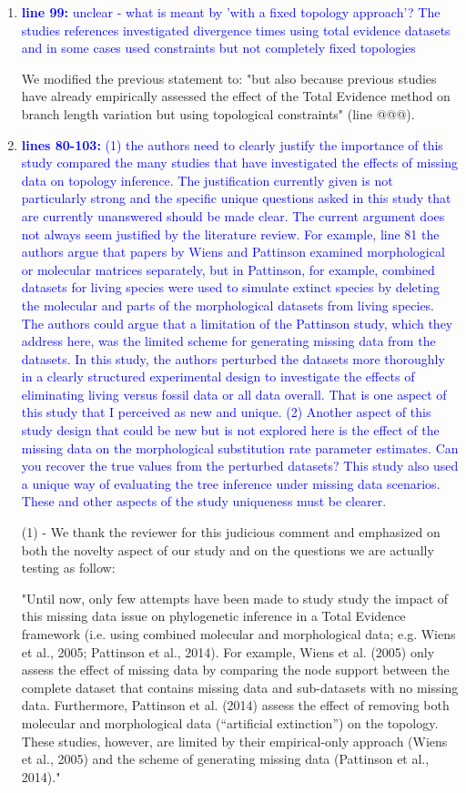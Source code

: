 \documentclass[12pt,letterpaper]{article}
\begin{document}
\begin{enumerate}
\item{\textcolor{blue}{\textbf{line 99:} unclear - what is meant by 'with a fixed topology approach'? The studies references investigated divergence times using total evidence datasets and in some cases used constraints but not completely fixed topologies}}

We modified the previous statement to: "but also because previous studies have already empirically assessed the effect of the Total Evidence method on branch length variation but using topological constraints" (line @@@).

\item{\textcolor{blue}{\textbf{lines 80-103:} (1) the authors need to clearly justify the importance of this study compared the many studies that have investigated the effects of missing data on topology inference.
The justification currently given is not particularly strong and the specific unique questions asked in this study that are currently unanswered should be made clear.
The current argument does not always seem justified by the literature review.
For example, line 81 the authors argue that papers by Wiens and Pattinson examined morphological or molecular matrices separately, but in Pattinson, for example, combined datasets for living species were used to simulate extinct species by deleting the molecular and parts of the morphological datasets from living species.
The authors could argue that a limitation of the Pattinson study, which they address here, was the limited scheme for generating missing data from the datasets.
In this study, the authors perturbed the datasets more thoroughly in a clearly structured experimental design to investigate the effects of eliminating living versus fossil data or all data overall.
That is one aspect of this study that I perceived as new and unique.
(2) Another aspect of this study design that could be new but is not explored here is the effect of the missing data on the morphological substitution rate parameter estimates.
Can you recover the true values from the perturbed datasets?
This study also used a unique way of evaluating the tree inference under missing data scenarios.
These and other aspects of the study uniqueness must be clearer.}}

(1) - We thank the reviewer for this judicious comment and emphasized on both the novelty aspect of our study and on the questions we are actually testing as follow:

"Until now, only few attempts have been made to study study the impact of this missing data issue on phylogenetic inference in a Total Evidence framework (i.e. using combined molecular and morphological data; e.g. Wiens et al., 2005; Pattinson et al., 2014). For example, Wiens et al. (2005) only assess the effect of missing data by comparing the node support between the complete dataset that contains missing data and sub-datasets with no missing data. Furthermore, Pattinson et al. (2014) assess the effect of removing both molecular and morphological data (“artificial extinction”) on the topology. These studies, however, are limited by their empirical-only approach (Wiens et al., 2005) and the scheme of generating missing data (Pattinson et al., 2014)."


\end{enumerate}
\end{document}
